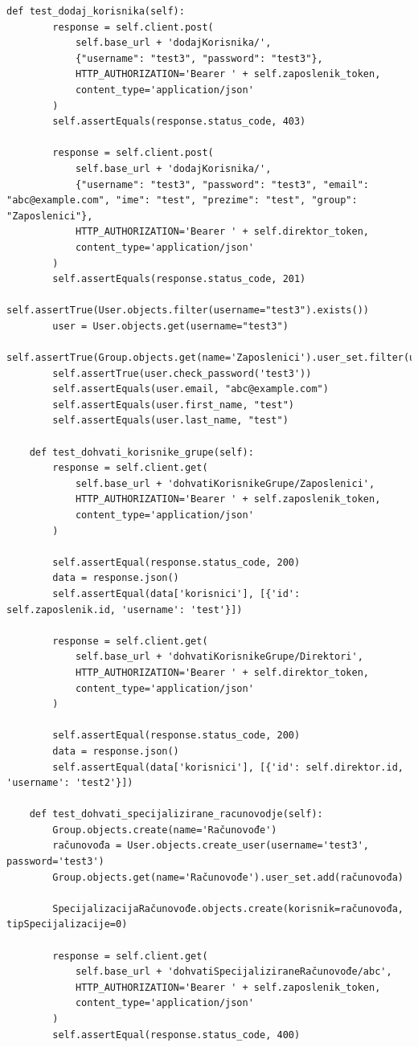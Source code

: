 \begin{lstlisting}[breaklines=true]
	def test_dodaj_korisnika(self):
		response = self.client.post(
			self.base_url + 'dodajKorisnika/',
			{"username": "test3", "password": "test3"},
			HTTP_AUTHORIZATION='Bearer ' + self.zaposlenik_token,
			content_type='application/json'
		)
		self.assertEquals(response.status_code, 403)

		response = self.client.post(
			self.base_url + 'dodajKorisnika/',
			{"username": "test3", "password": "test3", "email": "abc@example.com", "ime": "test", "prezime": "test", "group": "Zaposlenici"},
			HTTP_AUTHORIZATION='Bearer ' + self.direktor_token,
			content_type='application/json'
		)
		self.assertEquals(response.status_code, 201)
		self.assertTrue(User.objects.filter(username="test3").exists())
		user = User.objects.get(username="test3")
		self.assertTrue(Group.objects.get(name='Zaposlenici').user_set.filter(username="test3").exists())
		self.assertTrue(user.check_password('test3'))
		self.assertEquals(user.email, "abc@example.com")
		self.assertEquals(user.first_name, "test")
		self.assertEquals(user.last_name, "test")
		
	def test_dohvati_korisnike_grupe(self):
		response = self.client.get(
			self.base_url + 'dohvatiKorisnikeGrupe/Zaposlenici',
			HTTP_AUTHORIZATION='Bearer ' + self.zaposlenik_token,
			content_type='application/json'
		)
		
		self.assertEqual(response.status_code, 200)
		data = response.json()
		self.assertEqual(data['korisnici'], [{'id': self.zaposlenik.id, 'username': 'test'}])
		
		response = self.client.get(
			self.base_url + 'dohvatiKorisnikeGrupe/Direktori',
			HTTP_AUTHORIZATION='Bearer ' + self.direktor_token,
			content_type='application/json'
		)
		
		self.assertEqual(response.status_code, 200)
		data = response.json()
		self.assertEqual(data['korisnici'], [{'id': self.direktor.id, 'username': 'test2'}])
		
	def test_dohvati_specijalizirane_racunovodje(self):
		Group.objects.create(name='Računovođe')
		računovođa = User.objects.create_user(username='test3', password='test3')
		Group.objects.get(name='Računovođe').user_set.add(računovođa)

		SpecijalizacijaRačunovođe.objects.create(korisnik=računovođa, tipSpecijalizacije=0)
		
		response = self.client.get(
			self.base_url + 'dohvatiSpecijaliziraneRačunovođe/abc',
			HTTP_AUTHORIZATION='Bearer ' + self.zaposlenik_token,
			content_type='application/json'
		)
		self.assertEqual(response.status_code, 400)
		

\end{lstlisting}
